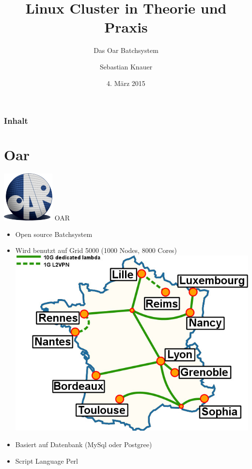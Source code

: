 \documentclass[10pt,utf8]{beamer}
\title{Linux Cluster in Theorie und Praxis}
\subtitle{Das Oar Batchsystem}
\author{Sebastian Knauer}
\date{4. M\"arz 2015}
\institute[ZIH TUD]{Zentrum f\"ur Informationsdienste und Hochleistungsrechnen -- TU Dresden}
\begin{document}
\zihmaketitle

\begin{frame}
\frametitle{Inhalt}
	\tableofcontents
\end{frame}

\section{Oar}
\begin{frame}{\includegraphics[scale=0.22, keepaspectratio]{oar-logo.png}  OAR}
    \begin{itemize}
        \item{Open source Batchsystem}
        \item{Wird benutzt auf Grid 5000 (1000 Nodes, 8000 Cores)
	        \includegraphics[scale=1.0, keepaspectratio]{grid5000.jpg}
            }
        \item{Basiert auf Datenbank (MySql oder Postgree) }
        \item{Script Language Perl}
    \end{itemize}
\end{frame}
\end{document}
